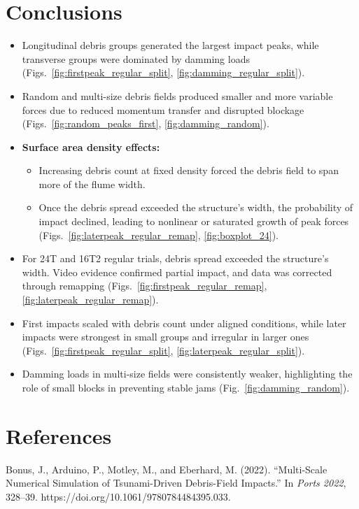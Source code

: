 \documentclass{article}
\begin{document}
\section{Conclusions}
\begin{itemize}
    \item Longitudinal debris groups generated the largest impact peaks, while transverse groups were dominated by damming loads (Figs.~\ref{fig:firstpeak_regular_split}, \ref{fig:damming_regular_split}).
    \item Random and multi-size debris fields produced smaller and more variable forces due to reduced momentum transfer and disrupted blockage (Figs.~\ref{fig:random_peaks_first}, \ref{fig:damming_random}).
    \item \textbf{Surface area density effects:}
    \begin{itemize}
        \item Increasing debris count at fixed density forced the debris field to span more of the flume width.
        \item Once the debris spread exceeded the structure’s width, the probability of impact declined, leading to nonlinear or saturated growth of peak forces (Figs.~\ref{fig:laterpeak_regular_remap}, \ref{fig:boxplot_24}).
    \end{itemize}
    \item For 24T and 16T2 regular trials, debris spread exceeded the structure’s width. Video evidence confirmed partial impact, and data was corrected through remapping (Figs.~\ref{fig:firstpeak_regular_remap}, \ref{fig:laterpeak_regular_remap}).
    \item First impacts scaled with debris count under aligned conditions, while later impacts were strongest in small groups and irregular in larger ones (Figs.~\ref{fig:firstpeak_regular_split}, \ref{fig:laterpeak_regular_split}).
    \item Damming loads in multi-size fields were consistently weaker, highlighting the role of small blocks in preventing stable jams (Fig.~\ref{fig:damming_random}).
\end{itemize}

\section{References}
Bonus, J., Arduino, P., Motley, M., and Eberhard, M. (2022). ``Multi-Scale Numerical Simulation of Tsunami-Driven Debris-Field Impacts.'' In \textit{Ports 2022}, 328–39. https://doi.org/10.1061/9780784484395.033.
\end{document}
